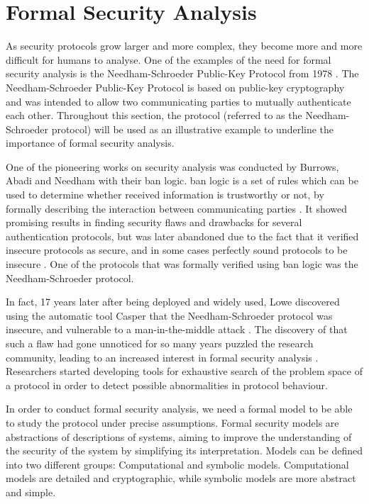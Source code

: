 \section{Formal Security Analysis} 
\label{sec:formal}

As security protocols grow larger and more complex, they become more and more difficult for humans to analyse. One of the examples of the need for formal security analysis is the Needham-Schroeder Public-Key Protocol from 1978 \cite{Needham:1978}. The Needham-Schroeder Public-Key Protocol is based on public-key cryptography and was intended to allow two communicating parties to mutually authenticate each other. Throughout this section, the protocol (referred to as the Needham-Schroeder protocol) will be used as an illustrative example to underline the importance of formal security analysis.

One of the pioneering works on security analysis was conducted by Burrows, Abadi and Needham with their \gls{ban} logic. \gls{ban} logic is a set of rules which can be used to determine whether received information is trustworthy or not, by formally describing the interaction between communicating parties \cite{burrows1989logic}. It showed promising results in finding security flaws and drawbacks for several authentication protocols, but was later abandoned due to the fact that it verified insecure protocols as secure, and in some cases perfectly sound protocols to be insecure \cite{boyd1993}. One of the protocols that was formally verified using \gls{ban} logic was the Needham-Schroeder protocol.

In fact, 17 years later after being deployed and widely used, Lowe discovered using the automatic tool Casper that the Needham-Schroeder protocol was insecure, and vulnerable to a man-in-the-middle attack \cite{basin2011model, lowe1996}. The discovery of that such a flaw had gone unnoticed for so many years puzzled the research community, leading to an increased interest in formal security analysis \cite{cremers2009comparing}. Researchers started developing tools for exhaustive search of the problem space of a protocol in order to detect possible abnormalities in protocol behaviour. 



In order to conduct formal security analysis, we need a formal model to be able to study the protocol under precise assumptions. Formal security models are abstractions of descriptions of systems, aiming to improve the understanding of the security of the system by simplifying its interpretation. Models can be defined into two different groups: Computational and symbolic models. Computational models are detailed and cryptographic, while symbolic models are more abstract and simple.

